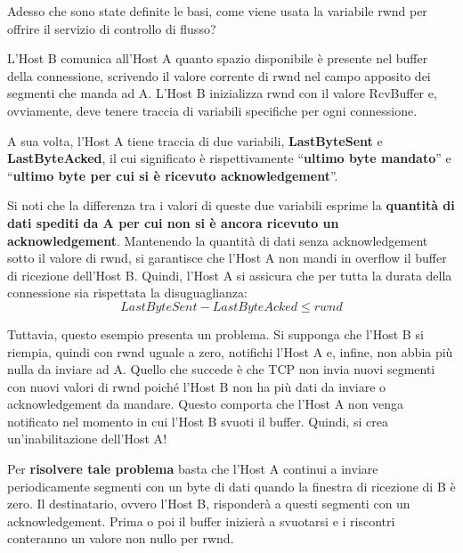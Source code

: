 \documentclass[a4paper]{article}
\newcommand{\dquotes}[1]{``#1''}
\begin{document}
	\noindent
	Adesso che sono state definite le basi, come viene usata la variabile rwnd per offrire il servizio di controllo di flusso?\newline
	
	\noindent
	L’\textsf{Host B} comunica all’\textsf{Host A} quanto spazio disponibile è presente nel buffer della connessione, scrivendo il valore corrente di \textsf{rwnd} nel campo apposito dei segmenti che manda ad A. L’\textsf{Host B} inizializza \textsf{rwnd} con il valore \textsf{RcvBuffer} e, ovviamente, deve tenere traccia di variabili specifiche per ogni connessione.\newline
	
	\noindent
	A sua volta, l’\textsf{Host A} tiene traccia di due variabili, \textbf{\textsf{LastByteSent}} e \textbf{\textsf{LastByteAcked}}, il cui significato è rispettivamente \dquotes{\textbf{ultimo byte mandato}} e \dquotes{\textbf{ultimo byte per cui si è ricevuto acknowledgement}}.\newline
	
	\noindent
	Si noti che la differenza tra i valori di queste due variabili esprime la \textbf{quantità di dati spediti da A per cui non si è ancora ricevuto un acknowledgement}. Mantenendo la quantità di dati senza acknowledgement sotto il valore di \textsf{rwnd}, si garantisce che l’\textsf{Host A} non mandi in overflow il buffer di ricezione dell’\textsf{Host B}. Quindi, l’\textsf{Host A} si assicura che per tutta la durata della connessione sia rispettata la disuguaglianza:
	\begin{equation*}
		LastByteSent - LastByteAcked \le rwnd
	\end{equation*}\newpage

	\noindent
	Tuttavia, questo esempio presenta un problema. Si supponga che l’\textsf{Host B} si riempia, quindi con \textsf{rwnd} uguale a zero, notifichi l’\textsf{Host A} e, infine, non abbia più nulla da inviare ad A. Quello che succede è che TCP non invia nuovi segmenti con nuovi valori di \textsf{rwnd} poiché l’\textsf{Host B} non ha più dati da inviare o acknowledgement da mandare. Questo comporta che l’\textsf{Host A} non venga notificato nel momento in cui l’\textsf{Host B} svuoti il buffer. Quindi, si crea un’inabilitazione dell’\textsf{Host A}!\newline
	
	\noindent
	Per \textbf{risolvere tale problema} basta che l’\textsf{Host A} continui a inviare periodicamente segmenti con un byte di dati quando la finestra di ricezione di B è zero. Il destinatario, ovvero l’\textsf{Host B}, risponderà a questi segmenti con un acknowledgement. Prima o poi il buffer inizierà a svuotarsi e i riscontri conteranno un valore non nullo per \textsf{rwnd}.\newline
	
\end{document}
